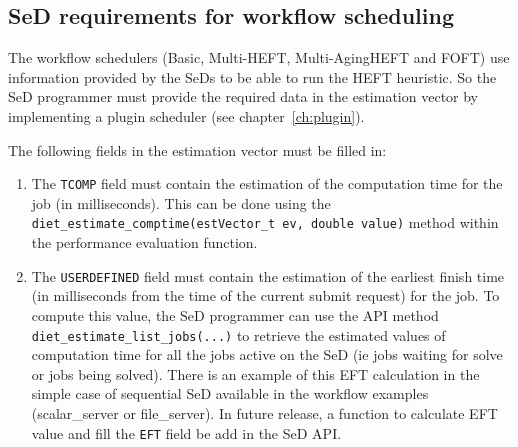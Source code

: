 \subsection{SeD requirements for workflow scheduling}

The workflow schedulers (Basic, Multi-HEFT, Multi-AgingHEFT and FOFT) use
information provided by the SeDs to be able to run the HEFT heuristic. So the
SeD programmer must provide the required data in the estimation vector by 
implementing a plugin scheduler (see chapter~\ref{ch:plugin}).

The following fields in the estimation vector must be filled in:
\begin{enumerate}
\item The \texttt{TCOMP} field must contain the estimation of the
computation time for the job (in milliseconds). This can be done using the
\texttt{diet\_estimate\_comptime(estVector\_t ev, double value)} method
within the performance evaluation function.
\item The \texttt{USERDEFINED} field must contain the estimation of the
earliest finish time (in milliseconds from the time of the current submit
request) for the job. To compute this value, the SeD programmer can use
the API method \\
\texttt{diet\_estimate\_list\_jobs(...)} to retrieve the
estimated values of computation time for all the jobs active on the SeD
(ie jobs waiting for solve or jobs being solved). There is an example of
this EFT calculation in the simple case of sequential SeD available in
the workflow examples (scalar\_server or file\_server).
In future release, a function to calculate EFT value and fill the 
\texttt{EFT} field be add in the SeD API. 
\end{enumerate}

